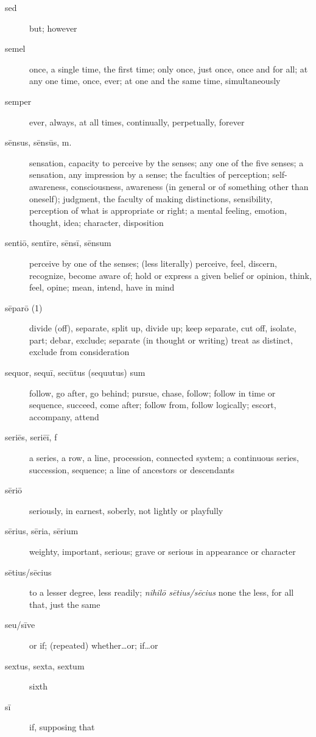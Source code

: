 \begin{description}
    \item[sed] \marginnote{*}but; however
    \item[semel] \marginnote{*}once, a single time, the first time; only once, just once, once and for all; at any one time, once, ever; at one and the same time, simultaneously
    \item[semper] \marginnote{*}ever, always, at all times, continually, perpetually, forever
    \item[sēnsus, sēnsūs, m.] sensation, capacity to perceive by the senses; any one of the five senses; a sensation, any impression by a sense; the faculties of perception; self-awareness, consciousness, awareness (in general or of something other than oneself); judgment, the faculty of making distinctions, sensibility, perception of what is appropriate or right; a mental feeling, emotion, thought, idea; character, disposition
    \item[sentiō, sentīre, sēnsī, sēnsum] \marginnote{*}perceive by one of the senses; (less literally) perceive, feel, discern, recognize, become aware of; hold or express a given belief or opinion, think, feel, opine; mean, intend, have in mind
    \item[sēparō (1)] divide (off), separate, split up, divide up; keep separate, cut off, isolate, part; debar, exclude; separate (in thought or writing) treat as distinct, exclude from consideration
    \item[sequor, sequī, secūtus (sequutus) sum] \marginnote{*}follow, go after, go behind; pursue, chase, follow; follow in time or sequence, succeed, come after; follow from, follow logically; escort, accompany, attend
    \item[seriēs, seriēī, f] a series, a row, a line, procession, connected system; a continuous series, succession, sequence; a line of ancestors or descendants
    \item[sēriō] seriously, in earnest, soberly, not lightly or playfully
    \item[sērius, sēria, sērium] weighty, important, serious; grave or serious in appearance or character
    \item[sētius/sēcius] to a lesser degree, less readily; \textit{nihilō sētius/sēcius} none the less, for all that, just the same
    \item[seu/sīve] \marginnote{*}or if; (repeated) whether\dots or; if\dots or
    \item[sextus, sexta, sextum] sixth
    \item[sī] \marginnote{*}if, supposing that

\end{description}
